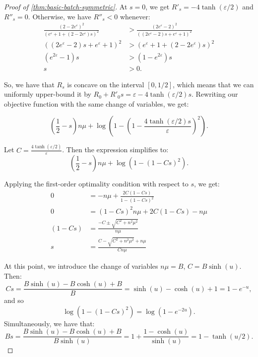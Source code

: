 \documentclass{article}
\begin{document}
\begin{proof}[Proof of \cref{thm:basic-batch-symmetric}]
    At $s=0$, we get $R'_s = -4\tanh(\varepsilon/2)$ and $R''_s=0$. Otherwise, we have $R''_s < 0$ whenever:
    \begin{align*}
        \frac{(2-2e^\varepsilon)^2}{(e^\varepsilon+1+(2-2e^\varepsilon)s)^2} 
        &> 
        \frac{(2e^\varepsilon-2)^2}{((2e^\varepsilon-2)s+e^\varepsilon+1)^2} 
        \\
        ((2e^\varepsilon-2)s+e^\varepsilon+1)^2
        &> 
        (e^\varepsilon+1+(2-2e^\varepsilon)s)^2
        \\
        (e^{2\varepsilon}-1)s 
        &>
        (1-e^{2\varepsilon})s \\
        s &> 0.
    \end{align*}

    So, we have that $R_s$ is concave on the interval $[0, 1/2]$, which means that we can uniformly upper-bound it by $R_0 + R'_0s = \varepsilon - 4\tanh(\varepsilon/2)s$. Rewriting our objective function with the same change of variables, we get:

    \begin{equation*}
        \left(\frac{1}{2}-s\right)n\mu + \log\left(1 - \left( 1 - \frac{4\tanh(\varepsilon/2)s}{\varepsilon} \right)^2 \right).
    \end{equation*}

    Let $C = \frac{4\tanh(\varepsilon/2)}{\varepsilon}$. Then the expression simplifies to:
    \begin{equation*}
        \left(\frac{1}{2}-s\right)n\mu + \log\left(1 - \left( 1 - Cs \right)^2 \right).
    \end{equation*}

    Applying the first-order optimality condition with respect to $s$, we get:
    \begin{align*}
        0 &= -n\mu + \frac{2C(1-Cs)}{1-(1-Cs)^2} \\
        0 &= (1-Cs)^2n\mu + 2C(1-Cs) - n\mu \\
        (1-Cs) &= \frac{-C \pm \sqrt{C^2+n^2\mu^2}}{n\mu} \\
        s &= \frac{C - \sqrt{C^2+n^2\mu^2} +n\mu}{Cn\mu}     
        \end{align*}

    At this point, we introduce the change of variables $n\mu = B$, $C = B \sinh(u)$. Then:
    \begin{equation*}
        Cs = \frac{B \sinh(u) - B\cosh(u) + B}{B} = \sinh(u) - \cosh(u) + 1 = 1-e^{-u},
    \end{equation*}
    and so
    \begin{equation*}
        \log(1-(1-Cs)^2) = \log(1-e^{-2u}).
    \end{equation*}
    Simultaneously, we have that:
    \begin{equation*}
        Bs = \frac{B\sinh(u) - B\cosh(u) + B}{B\sinh(u)} = 1+\frac{1-\cosh(u)}{\sinh(u)} = 1 - \tanh(u/2).
    \end{equation*}


\end{proof}
\end{document}
